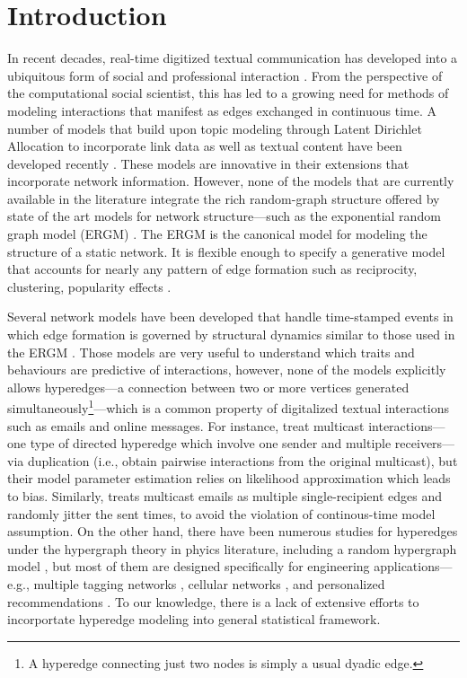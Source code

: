 \documentclass[12pt]{article}
\begin{document}
\section{Introduction}\label{sec:intro}
In recent decades, real-time digitized textual communication has developed into a ubiquitous form of social and professional interaction \citep{kanungo2008modeling, szostek2011dealing, burgess2004email, pew2016}. From the perspective of the computational social scientist, this has led to a growing need for methods of modeling interactions that manifest as edges exchanged in continuous time. A number of models that build upon topic modeling through Latent Dirichlet Allocation \citep{Blei2003} to incorporate link data as well as textual content have been developed recently \citep{mccallum2005author,lim2013twitter,Krafft2012}. These models are innovative in their extensions that incorporate network information. However, none of the models that are currently available in the literature integrate the rich random-graph structure offered by state of the art models for network structure---such as the exponential random graph model (ERGM) \citep{robins2007introduction,chatterjee2013estimating,hunter2008ergm}. The ERGM is the canonical model for modeling the structure of a static network. It is flexible enough to specify a generative model that accounts for nearly any pattern of edge formation such as reciprocity, clustering, popularity effects \citep{desmarais2017statistical}. 

Several network models have been developed that handle time-stamped events in which edge formation is governed by structural dynamics similar to those used in the ERGM \citep{Butts2008,Vu2011,snijders1996stochastic}. Those models are very useful to understand which traits and behaviours are predictive of interactions, however, none of the models explicitly allows hyperedges---a connection between two or more vertices generated simultaneously\footnote{A hyperedge connecting just two nodes is simply a usual dyadic edge.}---which is a common property of digitalized textual interactions such as emails and online messages. For instance, \cite{PerryWolfe2012} treat multicast interactions---one type of directed hyperedge which involve one sender and multiple receivers---via duplication (i.e., obtain pairwise interactions from the original multicast), but their model parameter estimation relies on likelihood approximation which leads to bias. Similarly, \cite{fan2009learning} treats multicast emails as multiple single-recipient edges and randomly jitter the sent times, to avoid the violation of continous-time model assumption. On the other hand, there have been numerous studies for hyperedges under the hypergraph theory \citep{karypis1999multilevel} in phyics literature, including a random hypergraph model \citep{ghoshal2009random}, but most of them are designed specifically for engineering applications---e.g., multiple tagging networks \citep{zlatic2009hypergraph,zhang2010hypergraph}, cellular networks \citep{klamt2009hypergraphs}, and personalized recommendations \citep{zhang2010personalized,blattner2009b}. To our knowledge, there is a lack of extensive efforts to incorportate hyperedge modeling into general statistical framework.
\end{document}
